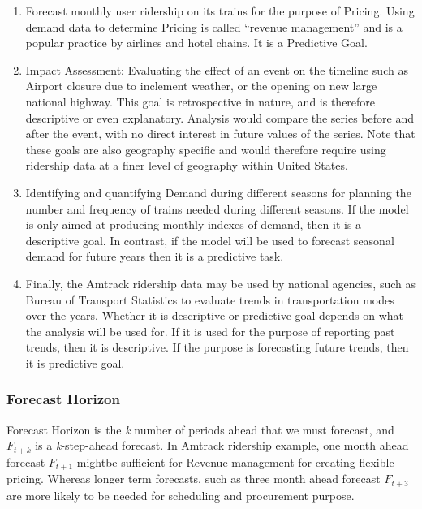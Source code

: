 \documentclass[]{article}
\begin{document}
\begin{enumerate}
\def\labelenumi{\arabic{enumi}.}
\item
  Forecast monthly user ridership on its trains for the purpose of
  Pricing. Using demand data to determine Pricing is called ``revenue
  management'' and is a popular practice by airlines and hotel chains.
  It is a Predictive Goal.
\item
  Impact Assessment: Evaluating the effect of an event on the timeline
  such as Airport closure due to inclement weather, or the opening on
  new large national highway. This goal is retrospective in nature, and
  is therefore descriptive or even explanatory. Analysis would compare
  the series before and after the event, with no direct interest in
  future values of the series. Note that these goals are also geography
  specific and would therefore require using ridership data at a finer
  level of geography within United States.
\item
  Identifying and quantifying Demand during different seasons for
  planning the number and frequency of trains needed during different
  seasons. If the model is only aimed at producing monthly indexes of
  demand, then it is a descriptive goal. In contrast, if the model will
  be used to forecast seasonal demand for future years then it is a
  predictive task.
\item
  Finally, the Amtrack ridership data may be used by national agencies,
  such as Bureau of Transport Statistics to evaluate trends in
  transportation modes over the years. Whether it is descriptive or
  predictive goal depends on what the analysis will be used for. If it
  is used for the purpose of reporting past trends, then it is
  descriptive. If the purpose is forecasting future trends, then it is
  predictive goal.
\end{enumerate}

\subsubsection{Forecast Horizon}\label{forecast-horizon}

Forecast Horizon is the \emph{k} number of periods ahead that we must
forecast, and \(F_{t+k}\) is a \emph{k}-step-ahead forecast. In Amtrack
ridership example, one month ahead forecast \(F_{t+1}\) mightbe
sufficient for Revenue management for creating flexible pricing. Whereas
longer term forecasts, such as three month ahead forecast \(F_{t+3}\)
are more likely to be needed for scheduling and procurement purpose.
\end{document}
